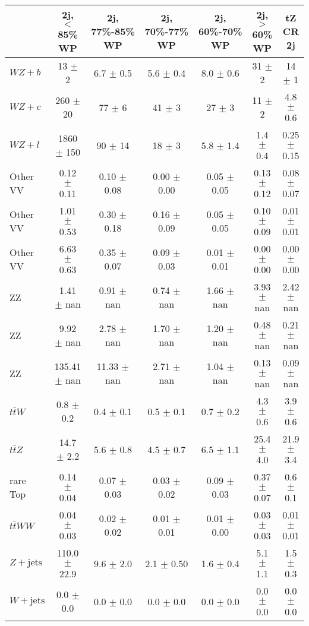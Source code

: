 \begin{tabular}{|l|S|S|S|S|S|S|}
\hline 
 & {2j, $<$85\% WP} & {2j, 77\%-85\% WP} & {2j, 70\%-77\% WP} & {2j, 60\%-70\% WP} & {2j, $>$60\% WP} & {tZ CR 2j}\\
\hline 
  $WZ + b$   & 13 $\pm$ 2 & 6.7 $\pm$ 0.5 & 5.6 $\pm$ 0.4 & 8.0 $\pm$ 0.6 & 31 $\pm$ 2 & 14 $\pm$ 1 \\ 
  $WZ + c$   & 260 $\pm$ 20 & 77 $\pm$ 6 & 41 $\pm$ 3 & 27 $\pm$ 3 & 11 $\pm$ 2 & 4.8 $\pm$ 0.6 \\ 
  $WZ + l$   & 1860 $\pm$ 150 & 90 $\pm$ 14 & 18 $\pm$ 3 & 5.8 $\pm$ 1.4 & 1.4 $\pm$ 0.4 & 0.25 $\pm$ 0.15 \\ 
  Other VV   & 0.12 $\pm$ 0.11 & 0.10 $\pm$ 0.08 & 0.00 $\pm$ 0.00 & 0.05 $\pm$ 0.05 & 0.13 $\pm$ 0.12 & 0.08 $\pm$ 0.07 \\ 
  Other VV   & 1.01 $\pm$ 0.53 & 0.30 $\pm$ 0.18 & 0.16 $\pm$ 0.09 & 0.05 $\pm$ 0.05 & 0.10 $\pm$ 0.09 & 0.01 $\pm$ 0.01 \\ 
  Other VV   & 6.63 $\pm$ 0.63 & 0.35 $\pm$ 0.07 & 0.09 $\pm$ 0.03 & 0.01 $\pm$ 0.01 & 0.00 $\pm$ 0.00 & 0.00 $\pm$ 0.00 \\ 
  ZZ   & 1.41 $\pm$ nan & 0.91 $\pm$ nan & 0.74 $\pm$ nan & 1.66 $\pm$ nan & 3.93 $\pm$ nan & 2.42 $\pm$ nan \\ 
  ZZ   & 9.92 $\pm$ nan & 2.78 $\pm$ nan & 1.70 $\pm$ nan & 1.20 $\pm$ nan & 0.48 $\pm$ nan & 0.21 $\pm$ nan \\ 
  ZZ   & 135.41 $\pm$ nan & 11.33 $\pm$ nan & 2.71 $\pm$ nan & 1.04 $\pm$ nan & 0.13 $\pm$ nan & 0.09 $\pm$ nan \\ 
  $t\bar{t}W$   & 0.8 $\pm$ 0.2 & 0.4 $\pm$ 0.1 & 0.5 $\pm$ 0.1 & 0.7 $\pm$ 0.2 & 4.3 $\pm$ 0.6 & 3.9 $\pm$ 0.6 \\ 
  $t\bar{t}Z$   & 14.7 $\pm$ 2.2 & 5.6 $\pm$ 0.8 & 4.5 $\pm$ 0.7 & 6.5 $\pm$ 1.1 & 25.4 $\pm$ 4.0 & 21.9 $\pm$ 3.4 \\ 
  rare Top   & 0.14 $\pm$ 0.04 & 0.07 $\pm$ 0.03 & 0.03 $\pm$ 0.02 & 0.09 $\pm$ 0.03 & 0.37 $\pm$ 0.07 & 0.6 $\pm$ 0.1 \\ 
  $t\bar{t}WW$   & 0.04 $\pm$ 0.03 & 0.02 $\pm$ 0.02 & 0.01 $\pm$ 0.01 & 0.01 $\pm$ 0.00 & 0.03 $\pm$ 0.03 & 0.01 $\pm$ 0.01 \\ 
  $Z+\text{jets}$   & 110.0 $\pm$ 22.9 & 9.6 $\pm$ 2.0 & 2.1 $\pm$ 0.50 & 1.6 $\pm$ 0.4 & 5.1 $\pm$ 1.1 & 1.5 $\pm$ 0.3 \\ 
  $W+\text{jets}$   & 0.0 $\pm$ 0.0 & 0.0 $\pm$ 0.0 & 0.0 $\pm$ 0.0 & 0.0 $\pm$ 0.0 & 0.0 $\pm$ 0.0 & 0.0 $\pm$ 0.0 \\ 

\end{tabular}
